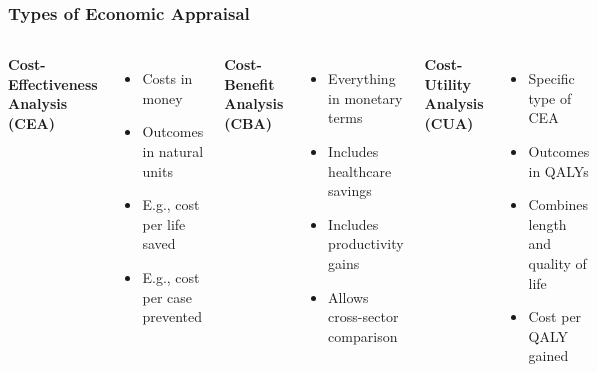 \documentclass{beamer}
\begin{document}
\begin{frame}
\frametitle{Types of Economic Appraisal}

\begin{columns}[t] %
\textbf{Cost-Effectiveness Analysis (CEA)}
\begin{itemize}[itemsep=0.2em] %
    \item Costs in money
    \item Outcomes in natural units
    \item E.g., cost per life saved
    \item E.g., cost per case prevented
\end{itemize}

\textbf{Cost-Benefit Analysis (CBA)}
\begin{itemize}[itemsep=0.2em] %
    \item Everything in monetary terms
    \item Includes healthcare savings
    \item Includes productivity gains
    \item Allows cross-sector comparison
\end{itemize}

\textbf{Cost-Utility Analysis (CUA)}
\begin{itemize}[itemsep=0.2em] %
    \item Specific type of CEA
    \item Outcomes in QALYs
    \item Combines length and quality of life
    \item Cost per QALY gained
\end{itemize}
\end{columns}

\vspace{0.3cm}
\begin{center}
\end{center}
\end{frame}
\end{document}
